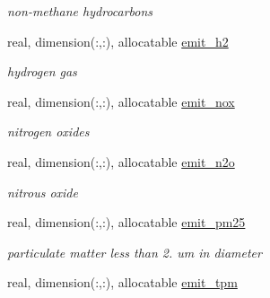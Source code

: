 \begin{DoxyCompactItemize}
\begin{DoxyCompactList}\small\item\em non-\/methane hydrocarbons \end{DoxyCompactList}\item 
\hypertarget{structctem__statevars_1_1veg__gat_a71c956bbe575a1b74a262f5f7f1d2a8b}{}real, dimension(\+:,\+:), allocatable \hyperlink{structctem__statevars_1_1veg__gat_a71c956bbe575a1b74a262f5f7f1d2a8b}{emit\+\_\+h2}\label{structctem__statevars_1_1veg__gat_a71c956bbe575a1b74a262f5f7f1d2a8b}

\begin{DoxyCompactList}\small\item\em hydrogen gas \end{DoxyCompactList}\item 
\hypertarget{structctem__statevars_1_1veg__gat_a470419c5b224dec25c733680aa9d920d}{}real, dimension(\+:,\+:), allocatable \hyperlink{structctem__statevars_1_1veg__gat_a470419c5b224dec25c733680aa9d920d}{emit\+\_\+nox}\label{structctem__statevars_1_1veg__gat_a470419c5b224dec25c733680aa9d920d}

\begin{DoxyCompactList}\small\item\em nitrogen oxides \end{DoxyCompactList}\item 
\hypertarget{structctem__statevars_1_1veg__gat_aa26d0b024a4d39ac0021eecf50c123e6}{}real, dimension(\+:,\+:), allocatable \hyperlink{structctem__statevars_1_1veg__gat_aa26d0b024a4d39ac0021eecf50c123e6}{emit\+\_\+n2o}\label{structctem__statevars_1_1veg__gat_aa26d0b024a4d39ac0021eecf50c123e6}

\begin{DoxyCompactList}\small\item\em nitrous oxide \end{DoxyCompactList}\item 
\hypertarget{structctem__statevars_1_1veg__gat_aa9cf764643bbd2fe844828051b9d1c0b}{}real, dimension(\+:,\+:), allocatable \hyperlink{structctem__statevars_1_1veg__gat_aa9cf764643bbd2fe844828051b9d1c0b}{emit\+\_\+pm25}\label{structctem__statevars_1_1veg__gat_aa9cf764643bbd2fe844828051b9d1c0b}

\begin{DoxyCompactList}\small\item\em particulate matter less than 2. um in diameter \end{DoxyCompactList}\item 
\hypertarget{structctem__statevars_1_1veg__gat_a758189398f80927f951577878c7dee0e}{}real, dimension(\+:,\+:), allocatable \hyperlink{structctem__statevars_1_1veg__gat_a758189398f80927f951577878c7dee0e}{emit\+\_\+tpm}\label{structctem__statevars_1_1veg__gat_a758189398f80927f951577878c7dee0e}


\end{DoxyCompactItemize}
